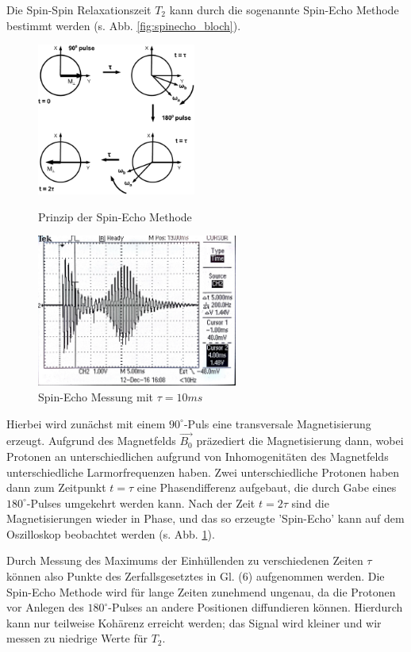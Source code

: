 \documentclass[a4paper]{scrartcl} %
\begin{document}
Die Spin-Spin Relaxationszeit $T_2$ kann durch die sogenannte Spin-Echo Methode bestimmt werden (s. Abb. \ref{fig:spinecho_bloch}).
\begin{figure}[!htb]
	\centering
	\parbox{70mm}{
		\centering
		\includegraphics[height=50mm]{./Resources/spin_ech_schematic.png}
		\caption{Prinzip der Spin-Echo Methode}
		\label{fig:spinecho_bloch}
	}
	\hspace*{\fill}
	\parbox{70mm}{
		\centering
		\includegraphics[height=50mm]{./Resources/spinecho_osci.jpg}
		\caption{Spin-Echo Messung mit $\tau=10ms$}
		\label{fig:spinecho_osci}
	}
\end{figure}

Hierbei wird zunächst mit einem $90^\circ$-Puls eine transversale Magnetisierung erzeugt. Aufgrund des Magnetfelds $\vec{B_0}$ präzediert die Magnetisierung dann, wobei Protonen an unterschiedlichen aufgrund von Inhomogenitäten des Magnetfelds unterschiedliche Larmorfrequenzen haben. Zwei unterschiedliche Protonen haben dann zum Zeitpunkt $t=\tau$ eine Phasendifferenz aufgebaut, die durch Gabe eines $180^\circ$-Pulses umgekehrt werden kann. Nach der Zeit $t=2\tau$ sind die Magnetisierungen wieder in Phase, und das so erzeugte 'Spin-Echo' kann auf dem Oszilloskop beobachtet werden (s. Abb. \ref{fig:spinecho_osci}).

Durch Messung des Maximums der Einhüllenden zu verschiedenen Zeiten $\tau$ können also Punkte des Zerfallsgesetztes in Gl. (6) aufgenommen werden. 
Die Spin-Echo Methode wird für lange Zeiten zunehmend ungenau, da die Protonen vor Anlegen des $180^\circ$-Pulses an andere Positionen diffundieren können. Hierdurch kann nur teilweise Kohärenz erreicht werden; das Signal wird kleiner und wir messen zu niedrige Werte für $T_2$.
\end{document}
